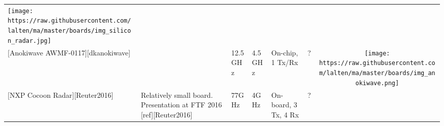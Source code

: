 \begin{longtable}[]{@{}llllllc@{}}
\begin{minipage}[t]{0.10\columnwidth}
\texttt{[image: https://raw.githubusercontent.com/lalten/ma/master/boards/img\_silicon\_radar.jpg]}
\strut
\end{minipage}\tabularnewline
\begin{minipage}[t]{0.09\columnwidth}\raggedright\strut
{[}Anokiwave AWMF-0117{]}{[}dkanokiwave{]}\strut
\end{minipage} & \begin{minipage}[t]{0.13\columnwidth}\raggedright\strut
\strut
\end{minipage} & \begin{minipage}[t]{0.09\columnwidth}\raggedright\strut
12.5GHz\strut
\end{minipage} & \begin{minipage}[t]{0.11\columnwidth}\raggedright\strut
4.5GHz\strut
\end{minipage} & \begin{minipage}[t]{0.10\columnwidth}\raggedright\strut
On-chip, 1 Tx/Rx\strut
\end{minipage} & \begin{minipage}[t]{0.15\columnwidth}\raggedright\strut
?\strut
\end{minipage} & \begin{minipage}[t]{0.10\columnwidth}\centering\strut
\texttt{[image: https://raw.githubusercontent.com/lalten/ma/master/boards/img\_anokiwave.png]}\strut
\end{minipage}\tabularnewline
\begin{minipage}[t]{0.09\columnwidth}\raggedright\strut
{[}NXP Cocoon Radar{]}{[}Reuter2016{]}\strut
\end{minipage} & \begin{minipage}[t]{0.13\columnwidth}\raggedright\strut
Relatively small board. Presentation at FTF 2016
{[}ref{]}{[}Reuter2016{]}\strut
\end{minipage} & \begin{minipage}[t]{0.09\columnwidth}\raggedright\strut
77GHz\strut
\end{minipage} & \begin{minipage}[t]{0.11\columnwidth}\raggedright\strut
4GHz\strut
\end{minipage} & \begin{minipage}[t]{0.10\columnwidth}\raggedright\strut
On-board, 3 Tx, 4 Rx\strut
\end{minipage} & \begin{minipage}[t]{0.15\columnwidth}\raggedright\strut
?\strut
\end{minipage} & \begin{minipage}[t]{0.10\columnwidth}\centering\strut

\end{minipage}
\end{longtable}
